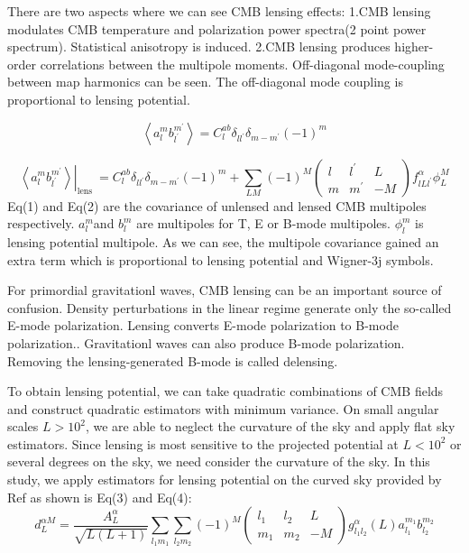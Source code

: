 \documentclass[12pt, notitlepage, onecolumn, amsmath, amssymb, aps]{revtex4-1}
\begin{document}
There are two aspects where we can see CMB lensing effects:
1.CMB lensing modulates CMB temperature and polarization power spectra(2 point power spectrum). Statistical anisotropy is induced.
2.CMB lensing produces higher-order correlations between the multipole moments. Off-diagonal mode-coupling between map harmonics can be seen. The off-diagonal mode coupling is proportional to lensing potential.\cite{Hu:2001kj}

\begin{equation}
  \left\langle a_{l}^{m} b_{l^{\prime}}^{m^{\prime}}\right\rangle= C_{l}^{a b} \delta_{l l^{\prime}} \delta_{m-m^{\prime}}(-1)^{m}
\end{equation}

\begin{equation}
  \left.\left\langle a_{l}^{m} b_{l^{\prime}}^{m^{\prime}}\right\rangle\right|_{\text {lens }}=C_{l}^{a b} \delta_{l l^{\prime}} \delta_{m-m^{\prime}}(-1)^{m}+\sum_{L M}(-1)^{M}\left(\begin{array}{ccc}
{l} & {l^{\prime}} & {L} \\
{m} & {m^{\prime}} & {-M}
\end{array}\right) f_{l L l^{\prime}}^{\alpha} \phi_{L}^{M}
\end{equation}
Eq(1) and Eq(2) are the covariance of unlensed and lensed CMB multipoles respectively. \(a_{l}^{m} \)and \(b_{l}^{m} \)  are multipoles for T, E or B-mode multipoles. \(\phi_{l}^{m}\) is lensing potential multipole. As we can see, the multipole covariance gained an extra term which is proportional to lensing potential and Wigner-3j symbols. 

For primordial gravitationl waves, CMB lensing can be an important source of confusion\cite{Lewis:2006fu}. Density perturbations in the linear regime generate only the so-called E-mode polarization\cite{Kamionkowski:1996ks}. Lensing converts E-mode polarization to B-mode polarization.\cite{Zaldarriaga:1998ar}. Gravitationl waves can also produce B-mode polarization\cite{Hu:2000ee}. Removing the lensing-generated B-mode is called delensing.

To obtain lensing potential, we can take quadratic combinations of CMB fields and construct quadratic estimators with minimum variance\cite{Hu:2000ee}. On small angular scales \(L>10^2\), we are able to neglect the curvature of the sky and apply flat sky estimators\cite{Hu:2001kj}. Since lensing is most sensitive to the projected potential at \(L<10^2\) or several degrees on the sky, we need consider the curvature of the sky. In this study, we apply estimators for lensing potential on the curved sky provided by Ref\cite{Okamoto:2003zw} as shown is Eq(3) and Eq(4):
\begin{equation}
  d_{L}^{\alpha M}=\frac{A_{L}^{\alpha}}{\sqrt{L(L+1)}} \sum_{l_{1} m_{1}} \sum_{l_{2} m_{2}}(-1)^{M}\left(\begin{array}{ccc}
{l_{1}} & {l_{2}} & {L} \\
{m_{1}} & {m_{2}} & {-M}
\end{array}\right) g_{l_{1} l_{2}}^{\alpha}(L) a_{l_{1}}^{m_{1}} b_{l_{2}}^{m_{2}}
\end{equation}
\end{document}
